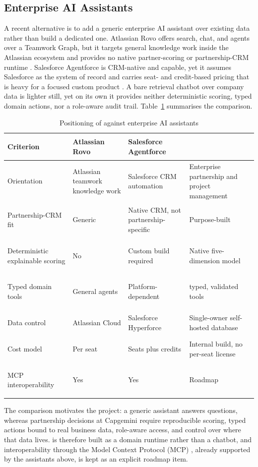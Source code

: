 \subsection{Enterprise AI Assistants}
A recent alternative is to add a generic enterprise AI assistant over existing data rather than build a dedicated one. Atlassian Rovo offers search, chat, and agents over a Teamwork Graph, but it targets general knowledge work inside the Atlassian ecosystem and provides no native partner-scoring or partnership-CRM runtime . Salesforce Agentforce is CRM-native and capable, yet it assumes Salesforce as the system of record and carries seat- and credit-based pricing that is heavy for a focused custom product . A bare retrieval chatbot over company data is lighter still, yet on its own it provides neither deterministic scoring, typed domain actions, nor a role-aware audit trail. Table~\ref{tab:ai-assistant-comparison} summarises the comparison.
\begin{table}[H]
  \centering
  \caption{Positioning of \projectname{} against enterprise AI assistants}
  \label{tab:ai-assistant-comparison}
  \small
  \begin{tabularx}{\textwidth}{>{\bfseries\raggedright\arraybackslash}p{3.4cm}
                               >{\raggedright\arraybackslash}X
                               >{\raggedright\arraybackslash}X
                               >{\raggedright\arraybackslash}X}
    \toprule
    Criterion & Atlassian Rovo & Salesforce Agentforce & \projectname{} \\
    \midrule
    Orientation & Atlassian teamwork knowledge work & Salesforce CRM automation & Enterprise partnership and project management \\
    \addlinespace
    Partnership-CRM fit & Generic & Native CRM, not partnership-specific & Purpose-built \\
    \addlinespace
    Deterministic explainable scoring & No & Custom build required & Native five-dimension model \\
    \addlinespace
    Typed domain tools & General agents & Platform-dependent & 24 typed, validated tools \\
    \addlinespace
    Data control & Atlassian Cloud & Salesforce Hyperforce & Single-owner self-hosted database \\
    \addlinespace
    Cost model & Per seat & Seats plus credits & Internal build, no per-seat license \\
    \addlinespace
    MCP interoperability & Yes & Yes & Roadmap \\
    \bottomrule
  \end{tabularx}
\end{table}
The comparison motivates the project: a generic assistant answers questions, whereas partnership decisions at Capgemini require reproducible scoring, typed actions bound to real business data, role-aware access, and control over where that data lives. \projectname{} is therefore built as a domain runtime rather than a chatbot, and interoperability through the Model Context Protocol (MCP) , already supported by the assistants above, is kept as an explicit roadmap item.
